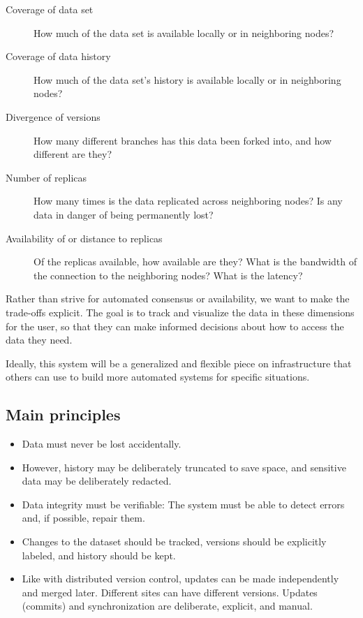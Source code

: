 \documentclass[a4paper]{article}
\begin{document}
\begin{description}

  \item[Coverage of data set] How much of the data set is available locally or
    in neighboring nodes?

  \item[Coverage of data history] How much of the data set's history is
    available locally or in neighboring nodes?

  \item[Divergence of versions] How many different branches has this data been
    forked into, and how different are they?

  \item[Number of replicas] How many times is the data replicated across
    neighboring nodes? Is any data in danger of being permanently lost?

  \item[Availability of or distance to replicas] Of the replicas available, how
    available are they? What is the bandwidth of the connection to the
    neighboring nodes? What is the latency?

\end{description}

Rather than strive for automated consensus or availability, we want to make the
trade-offs explicit.
The goal is to track and visualize the data in these dimensions for the user, so
that they can make informed decisions about how to access the data they need.

Ideally, this system will be a generalized and flexible piece on infrastructure
that others can use to build more automated systems for specific situations.


\subsection{Main principles}

\begin{itemize}

  \item Data must never be lost accidentally.

  \item However, history may be deliberately truncated to save space, and
    sensitive data may be deliberately redacted.

  \item Data integrity must be verifiable: The system must be able to detect
    errors and, if possible, repair them.

  \item Changes to the dataset should be tracked, versions should be explicitly
    labeled, and history should be kept.

  \item Like with distributed version control, updates can be made independently
    and merged later. Different sites can have different versions. Updates
    (commits) and synchronization are deliberate, explicit, and manual.

\end{itemize}
\end{document}

